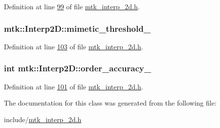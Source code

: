Definition at line \hyperlink{mtk__interp__2d_8h_source_l00099}{99} of file \hyperlink{mtk__interp__2d_8h_source}{mtk\+\_\+interp\+\_\+2d.\+h}.

\hypertarget{classmtk_1_1Interp2D_a842cfa59a56be76a240dd5de68007134}{
\subsubsection[{mimetic\+\_\+threshold\+\_\+}]{ mtk\+::\+Interp2\+D\+::mimetic\+\_\+threshold\+\_\+\hspace{0.3cm}{\ttfamily [private]}}}\label{classmtk_1_1Interp2D_a842cfa59a56be76a240dd5de68007134}


Definition at line \hyperlink{mtk__interp__2d_8h_source_l00103}{103} of file \hyperlink{mtk__interp__2d_8h_source}{mtk\+\_\+interp\+\_\+2d.\+h}.

\hypertarget{classmtk_1_1Interp2D_ad83cea724e0eff1d8b14bcba3575612e}{
\subsubsection[{order\+\_\+accuracy\+\_\+}]{\setlength{\rightskip}{0pt plus 5cm}int mtk\+::\+Interp2\+D\+::order\+\_\+accuracy\+\_\+\hspace{0.3cm}{\ttfamily [private]}}}\label{classmtk_1_1Interp2D_ad83cea724e0eff1d8b14bcba3575612e}


Definition at line \hyperlink{mtk__interp__2d_8h_source_l00101}{101} of file \hyperlink{mtk__interp__2d_8h_source}{mtk\+\_\+interp\+\_\+2d.\+h}.



The documentation for this class was generated from the following file\+:\begin{DoxyCompactItemize}
\item 
include/\hyperlink{mtk__interp__2d_8h}{mtk\+\_\+interp\+\_\+2d.\+h}\end{DoxyCompactItemize}
